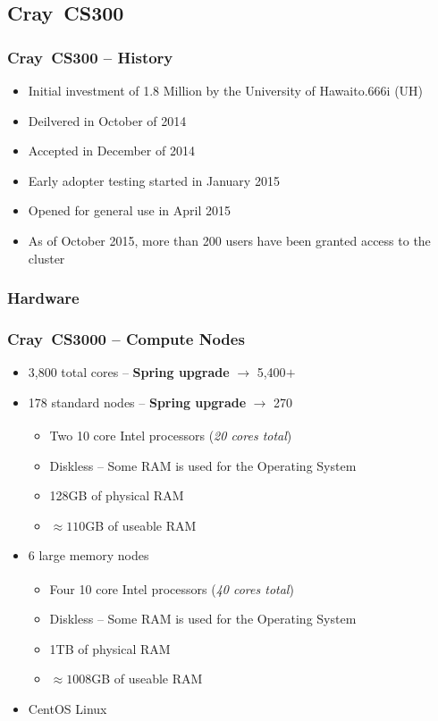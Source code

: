 \documentclass[t,hyperref={pdfpagelabels=false}]{beamer}
\newlength{\okinalen}
\newcommand{\okina}{\hbox to.666\okinalen{\hss`\hss}}
\newcommand{\regtrademark}{\fontsize{5}{6}\selectfont \textsuperscript{\textregistered}}
\newcommand{\hawaii}{Hawai{\okina}i}
\newcommand{\intel}{Intel{\regtrademark}}
\newcommand{\craycs}{Cray~CS300}
\begin{document}
\subsection{{\craycs}}
\begin{frame}
\frametitle{{\craycs} -- History}
\begin{itemize}
 \item Initial investment of 1.8 Million by the University of {\hawaii} (UH)
 \item Deilvered in October of 2014
 \item Accepted in December of 2014 
 \item Early adopter testing started in January 2015
 \item Opened for general use in April 2015
 \item As of October 2015, more than 200 users have been granted access to the cluster
\end{itemize}
\end{frame}


\subsubsection{Hardware}
\begin{frame}
	\frametitle{{\craycs}0 -- Compute Nodes}
	\begin{itemize}
		\item 3,800 total cores -- \textbf{Spring upgrade} $\rightarrow$ 5,400$+$
		\item 178 standard nodes -- \textbf{Spring upgrade} $\rightarrow$ 270
			\begin{itemize}
				\item Two 10 core {\intel} processors (\emph{20 cores total})
				\item Diskless -- Some RAM is used for the Operating System
				\item 128GB of physical RAM
				\item $\approx110$GB of useable RAM
			\end{itemize}
		\item 6 large memory nodes
			\begin{itemize}
				\item Four 10 core {\intel} processors (\emph{40 cores total})
				\item Diskless -- Some RAM is used for the Operating System
				\item 1TB of physical RAM
				\item $\approx1008$GB of useable RAM
			\end{itemize}			
		\item CentOS Linux
	\end{itemize}
\end{frame}
\end{document}
